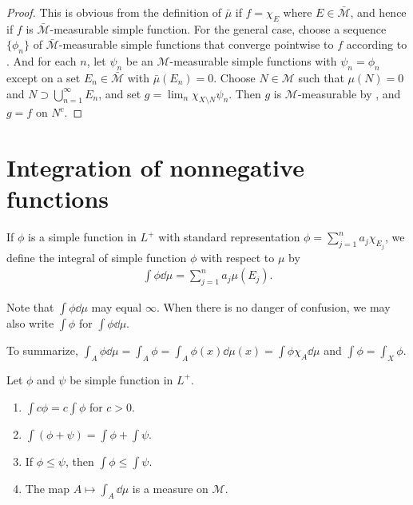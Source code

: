 \begin{proof}
    This is obvious from the definition of $\bar{\mu}$ if $f = \chi_E$ where $E \in \bar{\mathcal{M}}$, and hence if $f$ is $\bar{\mathcal{M}}$-measurable simple function.
    For the general case, choose a sequence $\{\phi_n\}$ of $\bar{\mathcal{M}}$-measurable simple functions that converge pointwise to $f$ according to .
    And for each $n$, let $\psi_n$ be an $\mathcal{M}$-measurable simple functions with $\psi_n = \phi_n$ except on a set $E_n \in \bar{\mathcal{M}}$ with $\bar{\mu}(E_n) = 0$.
    Choose $N \in \mathcal{M}$ such that $\mu(N) = 0$ and $N \supset \bigcup_{n=1}^{\infty} E_n$, and set $g = \lim_n \chi_{X \setminus N} \psi_n$.
    Then $g$ is $\mathcal{M}$-measurable by , and $g = f$ on $N^c$.
\end{proof}

\section{Integration of nonnegative functions}

\begin{definition}
    If $\phi$ is a simple function in $L^+$ with standard representation $\phi = \sum_{j=1}^{n} a_j \chi_{E_j}$, we define the integral of simple function $\phi$ with respect to $\mu$ by
    \begin{align}
        \int \phi \dd \mu = \sum_{j=1}^{n} a_j \mu(E_j).
    \end{align}
\end{definition}

Note that $\int \phi \dd \mu$ may equal $\infty$.
When there is no danger of confusion, we may also write $\int \phi$ for $\int \phi \dd \mu$.

To summarize, $\int_{A} \phi \dd \mu = \int_{A} \phi = \int_{A} \phi(x) \dd \mu(x) = \int \phi \chi_{A} \dd \mu$ and $\int \phi = \int_{X} \phi$.

\begin{proposition}
    Let $\phi$ and $\psi$ be simple function in $L^+$.
    \begin{enumerate}
        \item $\int c \phi = c \int \phi$ for $c > 0$.
        \item $\int (\phi + \psi) = \int \phi + \int \psi$.
        \item If $\phi \le \psi$, then $\int \phi \le \int \psi$.
        \item The map $A \mapsto \int_{A} \dd \mu$ is a measure on $\mathcal{M}$.
    \end{enumerate}
\end{proposition}

